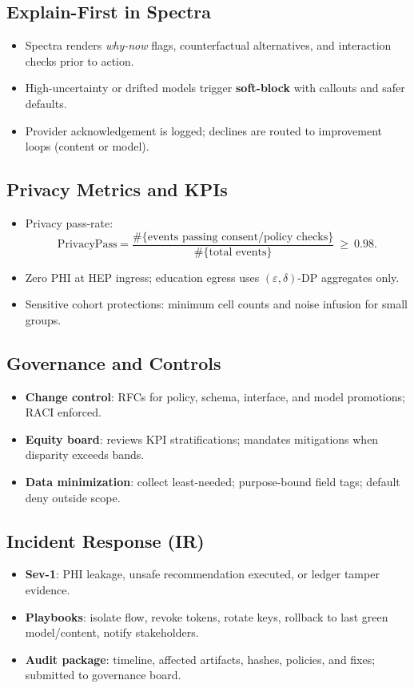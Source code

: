 \documentclass[11pt]{article}
\theoremstyle{plain}
\begin{document}
\subsection{Explain-First in Spectra}
\begin{itemize}
  \item Spectra renders \emph{why-now} flags, counterfactual alternatives, and interaction checks prior to action.
  \item High-uncertainty or drifted models trigger \textbf{soft-block} with callouts and safer defaults.
  \item Provider acknowledgement is logged; declines are routed to improvement loops (content or model).
\end{itemize}

\subsection{Privacy Metrics and KPIs}
\begin{itemize}
  \item Privacy pass-rate:
  \[
  \mathrm{PrivacyPass}=\frac{\#\{\text{events passing consent/policy checks}\}}{\#\{\text{total events}\}}\ \ge\ 0.98.
  \]
  \item Zero PHI at HEP ingress; education egress uses $(\varepsilon,\delta)$-DP aggregates only.
  \item Sensitive cohort protections: minimum cell counts and noise infusion for small groups.
\end{itemize}

\subsection{Governance and Controls}
\begin{itemize}
  \item \textbf{Change control}: RFCs for policy, schema, interface, and model promotions; RACI enforced.
  \item \textbf{Equity board}: reviews KPI stratifications; mandates mitigations when disparity exceeds bands.
  \item \textbf{Data minimization}: collect least-needed; purpose-bound field tags; default deny outside scope.
\end{itemize}

\subsection{Incident Response (IR)}
\begin{itemize}
  \item \textbf{Sev-1}: PHI leakage, unsafe recommendation executed, or ledger tamper evidence.
  \item \textbf{Playbooks}: isolate flow, revoke tokens, rotate keys, rollback to last green model/content, notify stakeholders.
  \item \textbf{Audit package}: timeline, affected artifacts, hashes, policies, and fixes; submitted to governance board.
\end{itemize}
\end{document}
